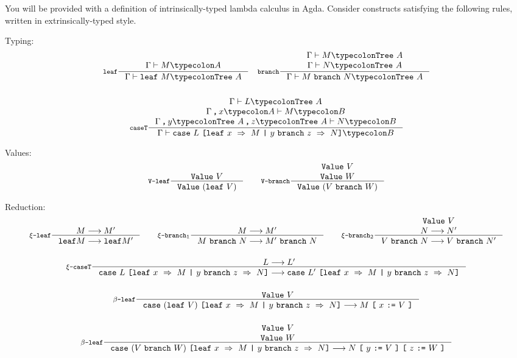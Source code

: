 \documentclass{examhons2018}
\begin{document}
\begin{enumerate}
You will be provided with a definition of intrinsically-typed lambda
calculus in Agda. Consider constructs satisfying the following rules,
written in extrinsically-typed style.

Typing:
\begin{gather*}
  \inference[\leaf]
    {\Gamma \vdash M \typecolon A}
    {\Gamma \vdash \leaf~M \typecolon \Tree~A}
\quad
  \inference[\branch]
    {\Gamma \vdash M \typecolon \Tree~A \\
     \Gamma \vdash N \typecolon \Tree~A}
    {\Gamma \vdash M~\branch~N \typecolon \Tree~A}
\\~\\
  \inference[\CASET]
    {\Gamma \vdash L \typecolon \Tree~A \\
     \Gamma \comma x \typecolon A \vdash M \typecolon B \\
     \Gamma \comma y \typecolon \Tree~A \comma z \typecolon \Tree~A \vdash N \typecolon B}
    {\Gamma \vdash \caseT{L}{x}{M}{y}{z}{N} \typecolon B}
\end{gather*}

Values:
\begin{gather*}
\inference[\V\dash\leaf]
  {\Value~V}
  {\Value~(\leaf~V)}
\qquad
\inference[\V\dash\branch]
  {\Value~V \\
   \Value~W}
  {\Value~(V~\branch~W)}
\end{gather*}

Reduction:
\begin{gather*}
\inference[$\xi\dash\leaf$]
  {M \becomes M'}
  {\leaf{M} \becomes \leaf{M'}}
\qquad
\inference[$\xi\dash\branch_1$]
  {M \becomes M'}
  {M~\branch~N \becomes M'~\branch~N}
\qquad
\inference[$\xi\dash\branch_2$]
  {\Value~V \\
   N \becomes N'}
  {V~\branch~N \becomes V~\branch~N'}
\\~\\
\inference[$\xi\dash\CASET$]
  {L \becomes L'}
  {\caseT{L}{x}{M}{y}{z}{N} \becomes \caseT{L'}{x}{M}{y}{z}{N}}
\\~\\  
\inference[$\beta\dash\leaf$]
  {\Value~V}
  {\caseT{(\leaf~V)}{x}{M}{y}{z}{N} \becomes \subst{M}{x}{V}}
\\~\\
\inference[$\beta\dash\leaf$]
  {\Value~V \\
   \Value~W}
  {\caseT{(V~\branch~W)}{x}{M}{y}{z}{N} \becomes \subst{\subst{N}{y}{V}}{z}{W}}
\end{gather*}


\end{enumerate}
\end{document}
